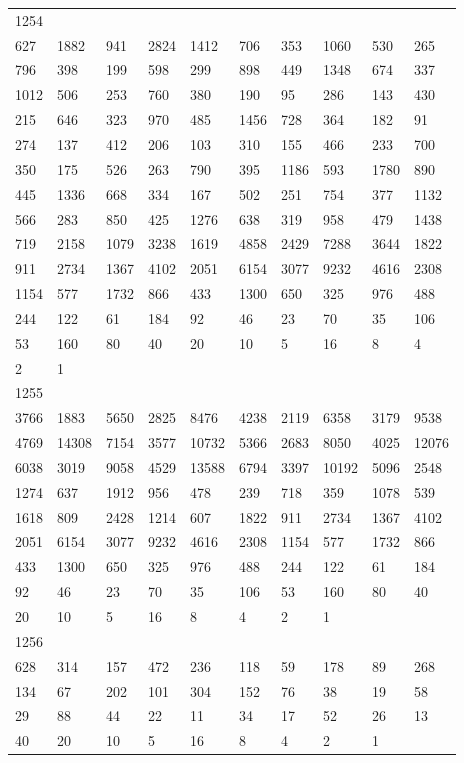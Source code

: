 \begin{longtable}{*{10}{l}}
1254&&&&&&&&&\\
627& 1882& 941& 2824& 1412& 706& 353& 1060& 530& 265\\
796& 398& 199& 598& 299& 898& 449& 1348& 674& 337\\
1012& 506& 253& 760& 380& 190& 95& 286& 143& 430\\
215& 646& 323& 970& 485& 1456& 728& 364& 182& 91\\
274& 137& 412& 206& 103& 310& 155& 466& 233& 700\\
350& 175& 526& 263& 790& 395& 1186& 593& 1780& 890\\
445& 1336& 668& 334& 167& 502& 251& 754& 377& 1132\\
566& 283& 850& 425& 1276& 638& 319& 958& 479& 1438\\
719& 2158& 1079& 3238& 1619& 4858& 2429& 7288& 3644& 1822\\
911& 2734& 1367& 4102& 2051& 6154& 3077& 9232& 4616& 2308\\
1154& 577& 1732& 866& 433& 1300& 650& 325& 976& 488\\
244& 122& 61& 184& 92& 46& 23& 70& 35& 106\\
53& 160& 80& 40& 20& 10& 5& 16& 8& 4\\
2& 1& \\

1255&&&&&&&&&\\
3766& 1883& 5650& 2825& 8476& 4238& 2119& 6358& 3179& 9538\\
4769& 14308& 7154& 3577& 10732& 5366& 2683& 8050& 4025& 12076\\
6038& 3019& 9058& 4529& 13588& 6794& 3397& 10192& 5096& 2548\\
1274& 637& 1912& 956& 478& 239& 718& 359& 1078& 539\\
1618& 809& 2428& 1214& 607& 1822& 911& 2734& 1367& 4102\\
2051& 6154& 3077& 9232& 4616& 2308& 1154& 577& 1732& 866\\
433& 1300& 650& 325& 976& 488& 244& 122& 61& 184\\
92& 46& 23& 70& 35& 106& 53& 160& 80& 40\\
20& 10& 5& 16& 8& 4& 2& 1& \\

1256&&&&&&&&&\\
628& 314& 157& 472& 236& 118& 59& 178& 89& 268\\
134& 67& 202& 101& 304& 152& 76& 38& 19& 58\\
29& 88& 44& 22& 11& 34& 17& 52& 26& 13\\
40& 20& 10& 5& 16& 8& 4& 2& 1& \\


\end{longtable}
